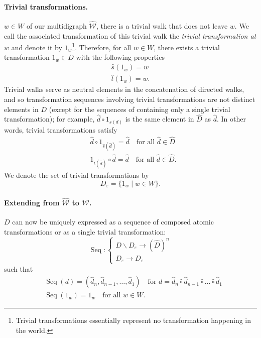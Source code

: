 \paragraph{Trivial transformations.}

 $w \in W$ of our multidigraph $\hat{\mathscr{W}}$, there is a trivial walk that does not leave $w$.
We call the associated transformation of this trivial walk the \emph{trivial transformation at $w$} and denote it by $1_{w}$\footnote{
Trivial transformations essentially represent no transformation happening in the world.
}.
Therefore, for all $w \in W$, there exists a trivial transformation $1_{w} \in D$ with the following properties
\begin{align}
	\hat{s}(1_{w}) = w \\
	\hat{t}(1_{w}) = w.
\end{align}
Trivial walks serve as neutral elements in the concatenation of directed walks, and so transformation sequences involving trivial transformations are not distinct elements in $D$ (except for the sequences of containing only a single trivial transformation); for example, $\hat{d} \circ 1_{s(d)}$ is the same element in $\hat{D}$ as $\hat{d}$.
In other words, trivial transformations satisfy
\begin{align}
	& \hat{d} \circ 1_{\hat{s}(\hat{d})} = \hat{d} \quad \text{for all $\hat{d} \in \hat{D}$} \\
	& 1_{\hat{t}(\hat{d})} \circ \hat{d} = \hat{d} \quad \text{for all $\hat{d} \in \hat{D}$}.
\end{align}
We denote the set of trivial transformations by
\begin{equation}
	D_{\varepsilon} = \{ 1_{w} \mid w \in W \}.
\end{equation}

\paragraph{Extending from $\hat{\mathscr{W}}$ to $\mathscr{W}$.}
 $D$ can now be uniquely expressed as a sequence of composed atomic transformations or as a single trivial transformation:
\begin{equation}
    \operatorname{Seq} : \left\{ 
    \begin{array}{l}
        D \backslash D_{\varepsilon} \to (\hat{D})^{n} \\
        D_{\varepsilon} \to D_{\varepsilon}
    \end{array} \right.
\end{equation}
such that
\begin{align}
    & \operatorname{Seq}(d) = (\hat{d}_{n}, \hat{d}_{n-1}, \dots, \hat{d}_{1}) \quad \text{for $d = \hat{d}_{n} \hat{\circ} \hat{d}_{n-1} \hat{\circ} \dots \hat{\circ} \hat{d}_{1}$} \\
    & \operatorname{Seq}(1_{w}) = 1_{w} \quad \text{for all $w \in W$}.
\end{align}

